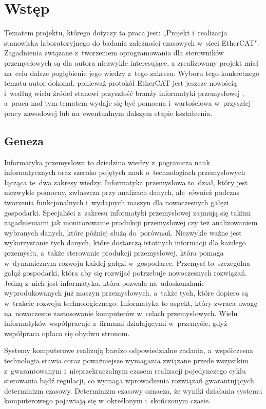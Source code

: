 \section{Wstęp}
Tematem projektu, którego dotyczy ta praca jest: „Projekt i~realizacja stanowiska laboratoryjnego do badania zależności czasowych w~sieci EtherCAT". Zagadnienia związane z~tworzeniem oprogramowania dla sterowników przemysłowych są dla autora niezwykle interesujące, a zrealizowany projekt miał na~celu dalsze pogłębienie jego wiedzy z~tego zakresu. Wyboru tego konkretnego tematu autor dokonał, ponieważ protokół EtherCAT jest jeszcze nowością i~według wielu źródeł stanowi przyszłość branży informatyki przemysłowej \cite{art1_etherCAT, art2_etherCAT}, a~praca nad tym tematem wydaje się być pomocna i~wartościowa w~przyszłej pracy zawodowej lub na~ewentualnym dalszym etapie kształcenia.

\subsection{Geneza}
Informatyka przemysłowa to dziedzina wiedzy z~pogranicza nauk informatycznych oraz szeroko pojętych nauk o~technologiach przemysłowych łącząca te~dwa zakresy wiedzy. Informatyka przemysłowa to~dział, który jest niezwykle pomocny, zwłaszcza przy analizach danych, ale~również podczas tworzenia funkcjonalnych i~wydajnych maszyn dla nowoczesnych gałęzi gospodarki. Specjaliści z~zakresu informatyki przemysłowej zajmują się takimi zagadnieniami jak monitorowanie produkcji przemysłowej czy też analizowaniem wybranych danych, które później służą do~porównań. Niezwykle ważne jest wykorzystanie tych danych, które dostarczą istotnych informacji dla każdego przemysłu, a~także sterowanie produkcji przemysłowej, która pomaga w~dynamicznym rozwoju każdej gałęzi w~gospodarce. 
Przemysł to~szczególna gałąź gospodarki, która aby się rozwijać potrzebuje nowoczesnych rozwiązań. Jedną z~nich jest informatyka, która pozwala na~udoskonalanie wyprodukowanych już maszyn przemysłowych, a~także tych, które dopiero są w~trakcie rozwoju technologicznego. Informatyka to aspekt, który zwraca uwagę na~nowoczesne zastosowanie komputerów w~celach przemysłowych. Wielu informatyków współpracuje z~firmami działającymi w~przemyśle, gdyż współpraca opłaca się obydwu stronom.

Systemy komputerowe realizują bardzo odpowiedzialne zadania, a~współczesna technologia stawia coraz poważniejsze wymagania związane przede wszystkim z~gwarantowanym i~nieprzekraczalnym czasem realizacji pojedynczego cyklu sterowania bądź regulacji, co wymaga wprowadzenia rozwiązań gwarantujących determinizm czasowy. Determinizm czasowy oznacza, że wyniki działania systemu komputerowego pojawiają się w~określonym i~skończonym czasie.


